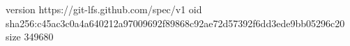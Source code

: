 version https://git-lfs.github.com/spec/v1
oid sha256:c45ac3c0a4a640212a97009692f89868c92ae72d57392f6dd3ede9bb05296c20
size 349680
